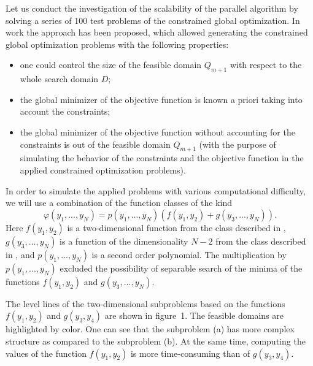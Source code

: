 \documentclass[a4paper]{jpconf}
\begin{document}
Let us conduct the investigation of the scalability of the parallel 
algorithm by solving a series of 100 test problems of the constrained global 
optimization. In work \cite{Gergel2017} the approach has been proposed, which allowed 
generating the constrained global optimization problems with the following 
properties:
\begin{itemize}
	\item one could control the size of the feasible domain $Q_{m+1}$ with 
respect to the whole search domain $D$;
	\item the global minimizer of the objective function is known a priori 
taking into account the constraints;
	\item the global minimizer of the objective function without accounting 
for the constraints is out of the feasible domain $Q_{m+1}$  (with the 
purpose of simulating the behavior of the constraints and the objective 
function in the applied constrained optimization problems).
\end{itemize}

In order to simulate the applied problems with various computational 
difficulty, we will use a combination of the function classes of the kind 
\[
\varphi(y_1,...,y_N) = p(y_1,...,y_N)(f(y_1,y_2)+g(y_3,...,y_N)).
\]
Here $f(y_1,y_2)$ is a two-dimensional function from the class described in \cite{Gergel2016}, $g(y_3,...,y_N)$ is a function of the dimensionality $N-2$ from the 
class described in \cite{Sergeyev2015}, and $p(y_1,...,y_N)$ is a second 
order polynomial. The multiplication by $p(y_1,...,y_N)$ excluded the possibility of 
separable search of the minima of the functions $f(y_1,y_2)$ and 
$g(y_3,...,y_N)$. 

The level lines of the two-dimensional subproblems based on the functions 
$f(y_1,y_2)$ and $g(y_3,y_4)$ are shown in figure~1. The feasible domains are highlighted by color. One can see that 
the subproblem (a) has more complex structure as compared to the subproblem 
(b). At the same time, computing the values of the function $f(y_1,y_2)$ is 
more time-consuming than of $g(y_3,y_4)$.
\end{document}

